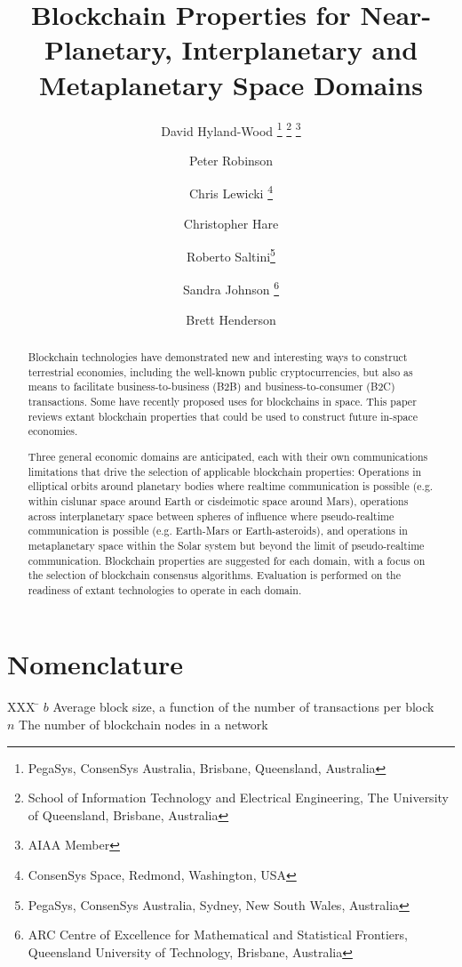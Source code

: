 \documentclass[]{aiaa-tc}%
\title{Blockchain Properties for Near-Planetary, Interplanetary and Metaplanetary Space Domains}
\author{
  David Hyland-Wood%
    \thanks{PegaSys, ConsenSys Australia, Brisbane, Queensland, Australia}
    \thanks{School of Information Technology and Electrical Engineering, The University of Queensland, Brisbane, Australia}
    \thanks{AIAA Member}\\
  \and Peter Robinson\thanksibid{1} \thanksibid{2}
  \and Chris Lewicki%
   \thanks{ConsenSys Space, Redmond, Washington, USA}
   \thanksibid{3}
  \and Christopher Hare\thanksibid{1}
  \and Roberto Saltini\thanks{PegaSys, ConsenSys Australia, Sydney, New South Wales, Australia}
  \and Sandra Johnson\thanksibid{1}
  	\thanks{ARC Centre of Excellence for Mathematical and Statistical Frontiers, Queensland University of Technology, Brisbane, Australia}
  \and Brett Henderson\thanksibid{1}
 }
\begin{document}
\maketitle

\begin{abstract}
Blockchain technologies have demonstrated new and interesting ways to construct terrestrial economies, including the well-known public cryptocurrencies, but also as means to facilitate business-to-business (B2B) and business-to-consumer (B2C) transactions. Some have recently proposed uses for blockchains in space. This paper reviews extant blockchain properties that could be used to construct future in-space economies.

Three general economic domains are anticipated, each with their own communications limitations that drive the selection of applicable blockchain properties: Operations in elliptical orbits around planetary bodies where realtime communication is possible (e.g. within cislunar space around Earth or cisdeimotic space around Mars), operations across interplanetary space between spheres of influence where pseudo-realtime communication is possible (e.g. Earth-Mars or Earth-asteroids), and operations in metaplanetary space within the Solar system but beyond the limit of pseudo-realtime communication. Blockchain properties are suggested for each domain, with a focus on the selection of blockchain consensus algorithms. Evaluation is performed on the readiness of extant technologies to operate in each domain.
\end{abstract}

\section*{Nomenclature}
\begin{tabbing}
  XXX \= \kill%
  $b$ \> Average block size, a function of the number of transactions per block \\
  $n$ \> The number of blockchain nodes in a network \\
 \end{tabbing}
\end{document}
